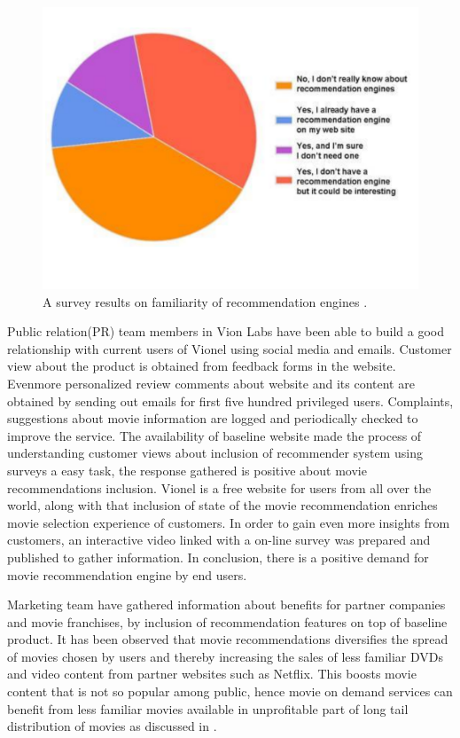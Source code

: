   \begin{figure}[htbp]
	\centering
		\includegraphics[scale=0.4]{Figures/familiarity_recommendation_engines.pdf}
	\caption[Graph: Familiarity of web based recommendation systems]{A survey results on familiarity of recommendation engines \citep{Recom8_voc}.}
	\label{fig: Familiarity of recommendation engines}
  \end{figure} 

  Public relation(PR) team members in Vion Labs have been able to build a good relationship with current users of Vionel using social media and emails. Customer view about the product is obtained from feedback forms in the website. Evenmore personalized review comments about website and its content are obtained by sending out emails for first five hundred privileged users. Complaints, suggestions about movie information are logged and periodically checked to improve the service. The availability of baseline website made the process of understanding customer views about inclusion of recommender system using surveys a easy task, the response gathered is positive about movie recommendations inclusion. Vionel is a free website for users from all over the world, along with that inclusion of state of the movie recommendation enriches movie selection experience of customers. In order to gain even more insights from customers, an interactive video linked with a on-line survey was prepared and published to gather information. In conclusion, there is a positive demand for movie recommendation engine by end users. 

  Marketing team have gathered information about benefits for partner companies and movie franchises, by inclusion of recommendation features on top of baseline product. It has been observed that movie recommendations diversifies the spread of movies chosen by users and thereby increasing the sales of less familiar DVDs and video content from partner websites such as Netflix. This boosts movie content that is not so popular among public, hence movie on demand services can benefit from less familiar movies available in unprofitable part of long tail distribution of movies as discussed in \citep{Profile_online}.

